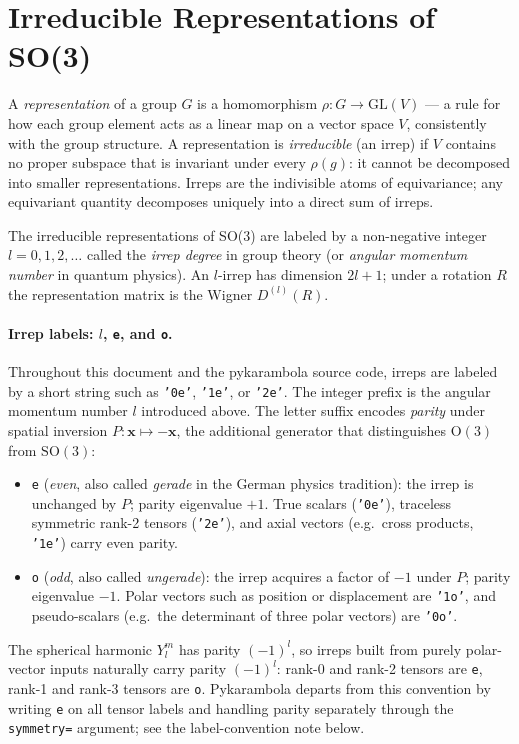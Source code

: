 \documentclass[11pt,a4paper]{article}
\begin{document}
\section{Irreducible Representations of SO(3)}
\label{sec:irreps}

A \emph{representation} of a group $G$ is a homomorphism $\rho: G \to \mathrm{GL}(V)$ — a rule for how each group element acts as a linear map on a vector space $V$, consistently with the group structure.
A representation is \emph{irreducible} (an irrep) if $V$ contains no proper subspace that is invariant under every $\rho(g)$: it cannot be decomposed into smaller representations.
Irreps are the indivisible atoms of equivariance; any equivariant quantity decomposes uniquely into a direct sum of irreps.

The irreducible representations of SO(3) are labeled by a non-negative integer
$l = 0, 1, 2, \ldots$ called the \emph{irrep degree} in group theory (or \emph{angular momentum number} in quantum physics).
An $l$-irrep has dimension $2l+1$; under a rotation $R$ the representation
matrix is the Wigner $D^{(l)}(R)$.

\paragraph{Irrep labels: $l$, \texttt{e}, and \texttt{o}.}
Throughout this document and the pykarambola source code, irreps are labeled by a short string such as \texttt{'0e'}, \texttt{'1e'}, or \texttt{'2e'}.
The integer prefix is the angular momentum number $l$ introduced above.
The letter suffix encodes \emph{parity} under spatial inversion $P : \mathbf{x} \mapsto -\mathbf{x}$, the additional generator that distinguishes $\mathrm{O}(3)$ from $\mathrm{SO}(3)$:
\begin{itemize}
  \item \texttt{e} (\emph{even}, also called \emph{gerade} in the German physics tradition):
        the irrep is unchanged by $P$; parity eigenvalue $+1$.
        True scalars (\texttt{'0e'}), traceless symmetric rank-2 tensors (\texttt{'2e'}), and
        axial vectors (e.g.\ cross products, \texttt{'1e'}) carry even parity.
  \item \texttt{o} (\emph{odd}, also called \emph{ungerade}):
        the irrep acquires a factor of $-1$ under $P$; parity eigenvalue $-1$.
        Polar vectors such as position or displacement are \texttt{'1o'}, and
        pseudo-scalars (e.g.\ the determinant of three polar vectors) are \texttt{'0o'}.
\end{itemize}
The spherical harmonic $Y_l^m$ has parity $(-1)^l$, so irreps built from purely polar-vector inputs naturally carry parity $(-1)^l$: rank-0 and rank-2 tensors are \texttt{e}, rank-1 and rank-3 tensors are \texttt{o}.
Pykarambola departs from this convention by writing \texttt{e} on all tensor labels and handling parity separately through the \texttt{symmetry=} argument; see the label-convention note below.
\end{document}
